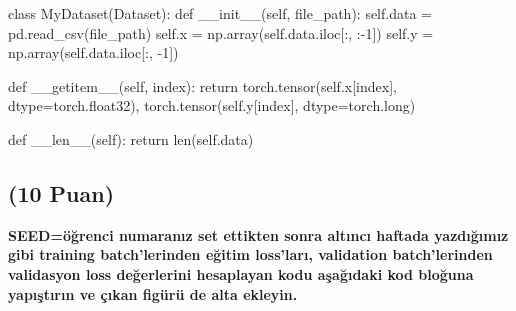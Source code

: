 \documentclass[11pt]{article}
\begin{document}
\begin{python}
class MyDataset(Dataset):
    def __init__(self, file_path):
        self.data = pd.read_csv(file_path)
        self.x = np.array(self.data.iloc[:, :-1])
        self.y = np.array(self.data.iloc[:, -1])
        
    def __getitem__(self, index):
        return torch.tensor(self.x[index], dtype=torch.float32), torch.tensor(self.y[index], dtype=torch.long)
        
    def __len__(self):
        return len(self.data)


\end{python}

\subsection{(10 Puan)} \textbf{SEED=öğrenci numaranız set ettikten sonra altıncı haftada yazdığımız gibi training batch'lerinden eğitim loss'ları, validation batch'lerinden validasyon loss değerlerini hesaplayan kodu aşağıdaki kod bloğuna yapıştırın ve çıkan figürü de alta ekleyin.}
\end{document}
